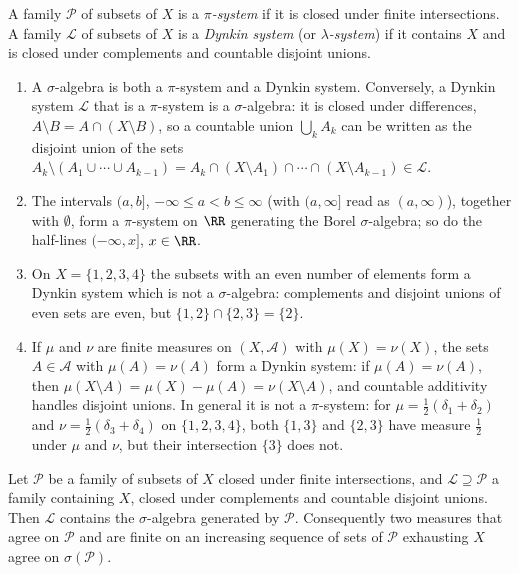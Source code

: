 \begin{definition}\label{measure-theory:definition-dynkin-system}
A family $\mathcal{P}$ of subsets of $X$ is a \emph{$\pi$-system} if it is closed under finite intersections. A family $\mathcal{L}$ of subsets of $X$ is a \emph{Dynkin system} (or
\emph{$\lambda$-system}) if it contains $X$ and is closed under complements and countable disjoint unions.
\end{definition}

\begin{example}\label{measure-theory:example-dynkin-systems}
\begin{enumerate}
\item A $\sigma$-algebra is both a $\pi$-system and a Dynkin system. Conversely, a Dynkin system $\mathcal{L}$ that is a $\pi$-system is a $\sigma$-algebra: it is closed under differences,
$A \setminus B = A \cap (X \setminus B)$, so a countable union $\bigcup_kA_k$ can be written as the disjoint union of the sets $A_k \setminus (A_1 \cup \cdots \cup A_{k-1})
= A_k \cap (X \setminus A_1) \cap \cdots \cap (X \setminus A_{k-1}) \in \mathcal{L}$.
\item The intervals $(a, b]$, $-\infty \leq a < b \leq \infty$ (with $(a, \infty]$ read as $(a, \infty)$), together with $\emptyset$, form a $\pi$-system on $\RR$ generating the Borel $\sigma$-algebra; so do
the half-lines $(-\infty, x]$, $x \in \RR$.
\item On $X = \{1, 2, 3, 4\}$ the subsets with an even number of elements form a Dynkin system which is not a $\sigma$-algebra: complements and disjoint unions of even sets are even, but
$\{1, 2\} \cap \{2, 3\} = \{2\}$.
\item If $\mu$ and $\nu$ are finite measures on $(X, \mathcal{A})$ with $\mu(X) = \nu(X)$, the sets $A \in \mathcal{A}$ with $\mu(A) = \nu(A)$ form a Dynkin system: if $\mu(A) = \nu(A)$, then
$\mu(X \setminus A) = \mu(X) - \mu(A) = \nu(X \setminus A)$, and countable additivity handles disjoint unions. In general it is not a $\pi$-system: for $\mu = \frac12(\delta_1 + \delta_2)$ and
$\nu = \frac12(\delta_3 + \delta_4)$ on $\{1, 2, 3, 4\}$, both $\{1, 3\}$ and $\{2, 3\}$ have measure $\frac12$ under $\mu$ and $\nu$, but their intersection $\{3\}$ does not.
\end{enumerate}
\end{example}

\begin{lemma}[Dynkin]\label{measure-theory:lemma-dynkin}
Let $\mathcal{P}$ be a family of subsets of $X$ closed under finite intersections, and $\mathcal{L} \supseteq \mathcal{P}$ a family containing $X$, closed under complements and countable disjoint unions.
Then $\mathcal{L}$ contains the $\sigma$-algebra generated by $\mathcal{P}$. Consequently two measures that agree on $\mathcal{P}$ and are finite on an increasing sequence of sets of $\mathcal{P}$ exhausting $X$ agree on
$\sigma(\mathcal{P})$.
\end{lemma}

